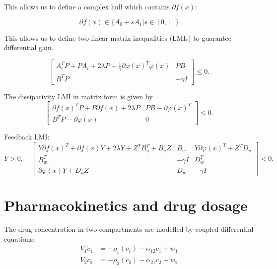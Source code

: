 \documentclass{article}
\begin{document}
This allows us to define a complex hull which contains $\partial f(x)$:

\begin{equation}
    \partial f(x) \in \{ A_0 + sA_1 | s \in [0,1]\}
\end{equation}

This allows us to define two linear matrix inequalities (LMIs) to guarantee differential gain. 

\begin{equation}
    \left[
    \begin{array}{cc}
    A_i^T P + P A_i + 2\lambda P + \frac{1}{\gamma} \partial \varphi(x)^T \varphi(x) & PB \\
    B^T P & -\gamma I
    \end{array}
    \right] \leq 0.
\end{equation}

The dissipativity LMI in matrix form is given by
\begin{equation}    
\left[
\begin{array}{cc}
\partial f(x)^T P + P \partial f(x) + 2\lambda P & PB - \partial \varphi(x)^T \\
B^T P - \partial \varphi(x) & 0
\end{array}
\right] \leq 0.
\end{equation}

Feedback LMI:
\begin{equation}
    Y > 0, \quad
    \left[
    \begin{array}{ccc}
    Y \partial f(x)^T + \partial f(x) Y + 2\lambda Y + Z^T B_u^T + B_u Z & B_w & Y \partial \varphi(x)^T + Z^T D_u \\
    B_w^T & -\gamma I & D_w^T \\
    \partial \varphi(x) Y + D_u Z & D_w & -\gamma I
    \end{array}
    \right] < 0.
\end{equation}

\section{Pharmacokinetics and drug dosage}

The drug concentration in two compartments are modelled by coupled differential equations:
\begin{align}
    V_1 \dot{c}_1 &= - \rho_1(c_1) - \alpha_{12}c_1 + w_1 \\
    V_2 \dot{c}_2 &= - \rho_2(c_2) - \alpha_{21}c_2 + w_2
\end{align}
\end{document}
